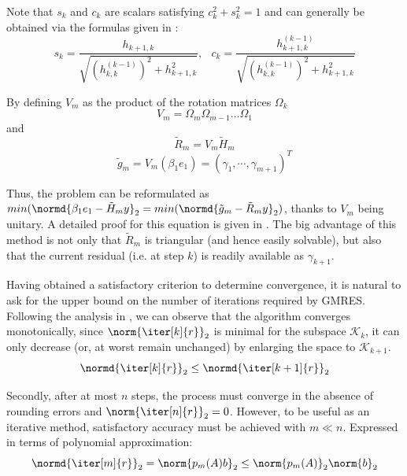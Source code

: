 \noindent Note that $s_k$ and $c_k$ are scalars satisfying $c^2_k+s^2_k=1$ and can generally be obtained via the formulas given in \cite{saad_iterative_2003}:
\begin{equation}
    s_k=\frac{h_{k+1, k}}{\sqrt{(h^{(k-1)}_{k,k})^2+h^2_{k+1, k}}}\text{,   } \;\;c_k=\frac{h^{(k-1)}_{k+1, k}}{\sqrt{(h^{(k-1)}_{k,k})^2+h^2_{k+1, k}}}
\end{equation}

\noindent By defining $V_m$ as the product of the rotation matrices $\Omega_k$
\begin{equation}
    V_m = \Omega_m \Omega_{m-1} \dots \Omega_1
\end{equation}
\noindent and
\begin{equation}
    \tilde{R}_m = V_m\tilde{H}_m 
\end{equation}
\begin{equation}
        \tilde{g}_m = V_m(\beta_1 e_1) = (\gamma_1, \cdots, \gamma_{m+1})^T
\end{equation}

\noindent Thus, the problem can be reformulated as $min(\normd{\beta_1 e_1 -\tilde{H}_my}_2=min(\normd{\tilde{g}_m -\tilde{R}_my}_2)$, thanks to $V_m$ being unitary. A detailed proof for this equation is given in \cite{saad_iterative_2003}. The big advantage of this method is not only that $\tilde{R}_m$ is triangular (and hence easily solvable), but also that the current residual (i.e. at step $k$) is readily available as $\gamma_{k+1}$.

Having obtained a satisfactory criterion to determine convergence, it is natural to ask for the upper bound on the number of iterations required by GMRES. Following the analysis in \cite{trefethen_numerical_1997}, we can observe that the algorithm converges monotonically, since $\norm{\iter[k]{r}}_2$ is minimal for the subspace $\mathcal{K}_k$, it can only decrease (or, at worst remain unchanged) by enlarging the space to $\mathcal{K}_{k+1}$.
\begin{equation}
    \normd{\iter[k]{r}}_2\leq \normd{\iter[k+1]{r}}_2
\end{equation}

\noindent Secondly, after at most $n$ steps, the process must converge in the absence of rounding errors and $\norm{\iter[n]{r}}_2 = 0$. However, to be useful as an iterative method, satisfactory accuracy must be achieved with  $m \ll n$. Expressed in terms of polynomial approximation: 
\begin{equation}
    \normd{\iter[m]{r}}_2=\norm{p_m(A)b}_2 \leq \norm{p_m(A)}_2\norm{b}_2
\end{equation}

